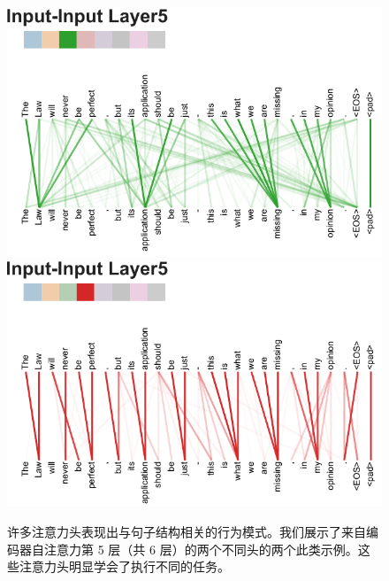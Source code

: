 \begin{figure}
{\includegraphics[width=\textwidth, trim=0 0 0 36, clip]{./vis/attending_to_head_new.pdf}}
{\includegraphics[width=\textwidth, trim=0 0 0 36, clip]{./vis/attending_to_head2_new.pdf}}
\caption{许多注意力头表现出与句子结构相关的行为模式。我们展示了来自编码器自注意力第 5 层（共 6 层）的两个不同头的两个此类示例。这些注意力头明显学会了执行不同的任务。}
\end{figure}
